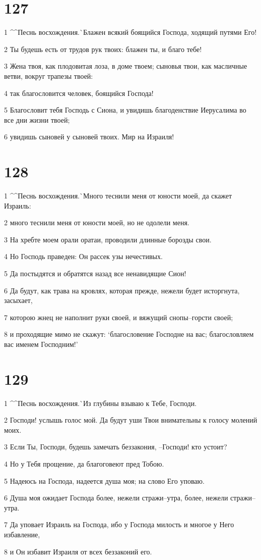 \chapter{127}

\par 1 ^^Песнь восхождения.^^ Блажен всякий боящийся Господа, ходящий путями Его!
\par 2 Ты будешь есть от трудов рук твоих: блажен ты, и благо тебе!
\par 3 Жена твоя, как плодовитая лоза, в доме твоем; сыновья твои, как масличные ветви, вокруг трапезы твоей:
\par 4 так благословится человек, боящийся Господа!
\par 5 Благословит тебя Господь с Сиона, и увидишь благоденствие Иерусалима во все дни жизни твоей;
\par 6 увидишь сыновей у сыновей твоих. Мир на Израиля!

\chapter{128}

\par 1 ^^Песнь восхождения.^^ Много теснили меня от юности моей, да скажет Израиль:
\par 2 много теснили меня от юности моей, но не одолели меня.
\par 3 На хребте моем орали оратаи, проводили длинные борозды свои.
\par 4 Но Господь праведен: Он рассек узы нечестивых.
\par 5 Да постыдятся и обратятся назад все ненавидящие Сион!
\par 6 Да будут, как трава на кровлях, которая прежде, нежели будет исторгнута, засыхает,
\par 7 которою жнец не наполнит руки своей, и вяжущий снопы--горсти своей;
\par 8 и проходящие мимо не скажут: `благословение Господне на вас; благословляем вас именем Господним!'

\chapter{129}

\par 1 ^^Песнь восхождения.^^ Из глубины взываю к Тебе, Господи.
\par 2 Господи! услышь голос мой. Да будут уши Твои внимательны к голосу молений моих.
\par 3 Если Ты, Господи, будешь замечать беззакония, --Господи! кто устоит?
\par 4 Но у Тебя прощение, да благоговеют пред Тобою.
\par 5 Надеюсь на Господа, надеется душа моя; на слово Его уповаю.
\par 6 Душа моя ожидает Господа более, нежели стражи--утра, более, нежели стражи--утра.
\par 7 Да уповает Израиль на Господа, ибо у Господа милость и многое у Него избавление,
\par 8 и Он избавит Израиля от всех беззаконий его.

